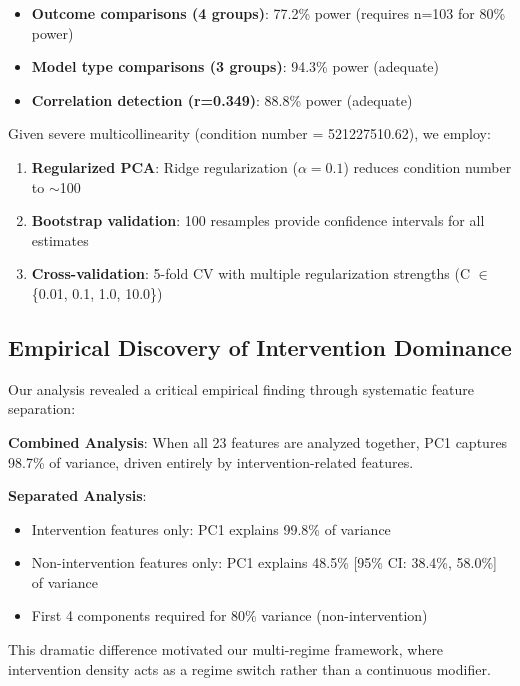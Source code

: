 \documentclass[11pt,letterpaper]{article}
\newcommand{\powerOutcomeGroups}{77.2\%}
\newcommand{\powerModelTypes}{94.3\%}
\newcommand{\powerCorrelation}{88.8\%}
\newcommand{\sampleSizeForeightyPower}{103}
\newcommand{\conditionNumber}{521227510.62}  %
\newcommand{\regularizationAlpha}{0.1}
\newcommand{\allFeaturesPCOne}{98.7\%}  %
\newcommand{\interventionPCOneVariance}{99.8\%}
\newcommand{\nonInterventionPCOneVariance}{48.5\%}  %
\newcommand{\nonInterventionPCOneCILower}{38.4\%}
\newcommand{\nonInterventionPCOneCIUpper}{58.0\%}
\newcommand{\bootstrapSamples}{100}
\begin{document}
\begin{itemize}
    \item \textbf{Outcome comparisons (4 groups)}: \powerOutcomeGroups{} power (requires n=\sampleSizeForeightyPower{} for 80\% power)
    \item \textbf{Model type comparisons (3 groups)}: \powerModelTypes{} power (adequate)
    \item \textbf{Correlation detection (r=0.349)}: \powerCorrelation{} power (adequate)
\end{itemize}

Given severe multicollinearity (condition number = \conditionNumber{}), we employ:

\begin{enumerate}
    \item \textbf{Regularized PCA}: Ridge regularization ($\alpha = \regularizationAlpha{}$) reduces condition number to $\sim$100
    \item \textbf{Bootstrap validation}: \bootstrapSamples{} resamples provide confidence intervals for all estimates
    \item \textbf{Cross-validation}: 5-fold CV with multiple regularization strengths (C $\in$ \{0.01, 0.1, 1.0, 10.0\})
\end{enumerate}

\subsection{Empirical Discovery of Intervention Dominance}

Our analysis revealed a critical empirical finding through systematic feature separation:

\textbf{Combined Analysis}: When all 23 features are analyzed together, PC1 captures \allFeaturesPCOne{} of variance, driven entirely by intervention-related features.

\textbf{Separated Analysis}:
\begin{itemize}
    \item Intervention features only: PC1 explains \interventionPCOneVariance{} of variance
    \item Non-intervention features only: PC1 explains \nonInterventionPCOneVariance{} [95\% CI: \nonInterventionPCOneCILower{}, \nonInterventionPCOneCIUpper{}] of variance
    \item First 4 components required for 80\% variance (non-intervention)
\end{itemize}

This dramatic difference motivated our multi-regime framework, where intervention density acts as a regime switch rather than a continuous modifier.
\end{document}

